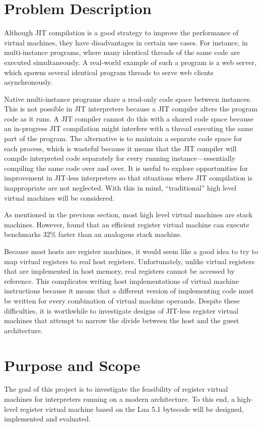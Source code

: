 	\section{Problem Description}
		Although JIT compilation is a good strategy to improve the performance of virtual machines, they have disadvantages in certain use cases. For instance, in multi-instance programs, where many identical threads of the same code are executed simultaneously. A real-world example of such a program is a web server, which spawns several identical program threads to serve web clients asynchronously.
		
		Native multi-instance programs share a read-only code space between instances. This is not possible in JIT interpreters because a JIT compiler alters the program code as it runs. A JIT compiler cannot do this with a shared code space because an in-progress JIT compilation might interfere with a thread executing the same part of the program. The alternative is to maintain a separate code space for each process, which is wasteful because it means that the JIT compiler will compile interpreted code separately for every running instance---essentially compiling the same code over and over. It is useful to explore opportunities for improvement in JIT-less interpreters so that situations where JIT compilation is inappropriate are not neglected. With this in mind, ``traditional'' high level virtual machines will be considered.
		
		As mentioned in the previous section, most high level virtual machines are stack machines. However, \cite{stackregistershowdown} found that an efficient register virtual machine can execute benchmarks 32\% faster than an analogous stack machine. 
		
		Because most hosts are register machines, it would seem like a good idea to try to map virtual registers to real host registers. Unfortunately, unlike virtual registers that are implemented in host memory, real registers cannot be accessed by reference.  This complicates writing host implementations of virtual machine instructions because it means that a different version of implementing code must be written for every combination of virtual machine operands. Despite these difficulties, it is worthwhile to investigate designs of JIT-less register virtual machines that attempt to narrow the divide between the host and the guest architecture.
	
	\section{Purpose and Scope}
		The goal of this project is to investigate the feasibility of register virtual machines for interpreters running on a modern architecture. To this end, a high-level register virtual machine based on the Lua 5.1 bytecode will be designed, implemented and evaluated.
	
